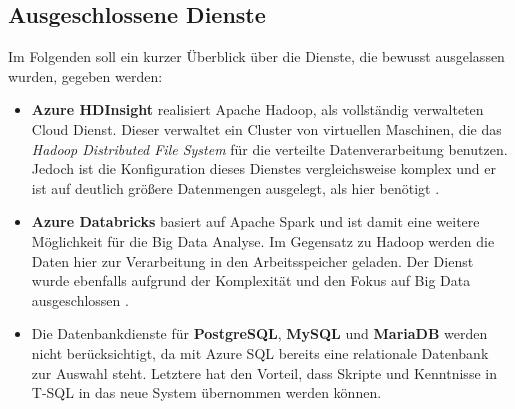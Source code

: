 \subsection{Ausgeschlossene Dienste} \label{sec:grundlagen:azure_dienste:ausgeschlosseneDienste}
Im Folgenden soll ein kurzer Überblick über die Dienste, die bewusst ausgelassen wurden, gegeben werden:
\begin{itemize}
\item \textbf{Azure HDInsight} realisiert Apache Hadoop, als vollständig verwalteten Cloud Dienst. Dieser verwaltet ein Cluster von virtuellen Maschinen, die das \textit{Hadoop Distributed File System} für die verteilte Datenverarbeitung benutzen. Jedoch ist die Konfiguration dieses Dienstes vergleichsweise komplex und er ist auf deutlich größere Datenmengen ausgelegt, als hier benötigt \cite[vgl.][]{klein_iot_2017}.
\item \textbf{Azure Databricks} basiert auf Apache Spark und ist damit eine weitere Möglichkeit für die Big Data Analyse. Im Gegensatz zu Hadoop werden die Daten hier zur Verarbeitung in den Arbeitsspeicher geladen. Der Dienst wurde ebenfalls aufgrund der Komplexität und den Fokus auf Big Data ausgeschlossen \cite[vgl.][]{soh_data_2020}.
\item Die Datenbankdienste für \textbf{PostgreSQL}, \textbf{MySQL} und \textbf{MariaDB} werden nicht berücksichtigt, da mit Azure SQL bereits eine relationale Datenbank zur Auswahl steht. Letztere hat den Vorteil, dass Skripte und Kenntnisse in T-SQL in das neue System übernommen werden können.
\end{itemize}